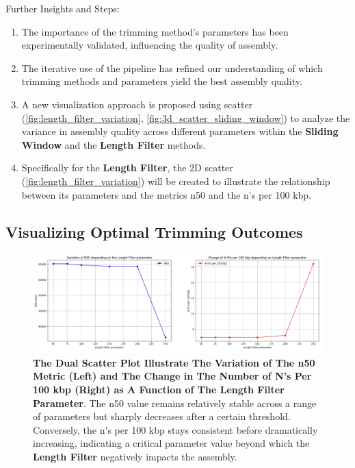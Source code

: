 Further Insights and Steps:

\begin{enumerate}
  \item The importance of the \gls{trimming} method's parameters has been experimentally validated, influencing the quality of \gls{assembly}.
  \item The iterative use of the pipeline has refined our understanding of which \gls{trimming} methods and parameters yield the best \gls{assembly} quality.
  \item A new visualization approach is proposed using \gls{scatter} (\autoref{fig:length_filter_variation}, \autoref{fig:3d_scatter_sliding_window}) to analyze the variance in \gls{assembly} quality across different parameters within the \textbf{Sliding Window} and the \textbf{Length Filter} methods.
  \item Specifically for the \textbf{Length Filter}, the 2D \gls{scatter} (\autoref{fig:length_filter_variation}) will be created to illustrate the relationship between its parameters and the metrics \gls{n50} and the \gls{n's per 100 kbp}.
\end{enumerate}



\subsection{Visualizing Optimal Trimming Outcomes}



\begin{figure}[H]
\centering
\includegraphics[width=\linewidth]{resources/images/length_filter_variation.png}
\caption{\textbf{The Dual Scatter Plot Illustrate The Variation of The \gls{n50} Metric (Left) and The Change in The Number of N's Per 100 kbp (Right) as A Function of The Length Filter Parameter}. The \gls{n50} value remains relatively stable across a range of parameters but sharply decreases after a certain threshold. Conversely, the \gls{n's per 100 kbp} stays consistent before dramatically increasing, indicating a critical parameter value beyond which the \textbf{Length Filter} negatively impacts the \gls{assembly}.}
\label{fig:length_filter_variation}
\end{figure}

